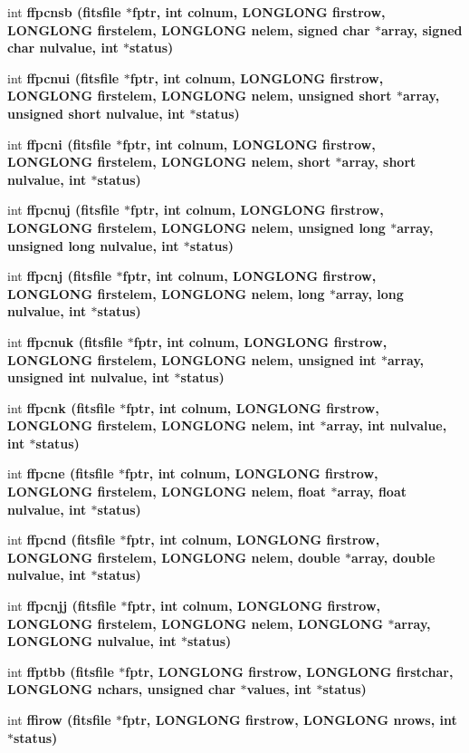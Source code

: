 \begin{CompactItemize}
\item 
int \bf{ffpcnsb} (\bf{fitsfile} $\ast$fptr, int colnum, \bf{LONGLONG} firstrow, \bf{LONGLONG} firstelem, \bf{LONGLONG} nelem, signed char $\ast$array, signed char nulvalue, int $\ast$status)
\item 
int \bf{ffpcnui} (\bf{fitsfile} $\ast$fptr, int colnum, \bf{LONGLONG} firstrow, \bf{LONGLONG} firstelem, \bf{LONGLONG} nelem, unsigned short $\ast$array, unsigned short nulvalue, int $\ast$status)
\item 
int \bf{ffpcni} (\bf{fitsfile} $\ast$fptr, int colnum, \bf{LONGLONG} firstrow, \bf{LONGLONG} firstelem, \bf{LONGLONG} nelem, short $\ast$array, short nulvalue, int $\ast$status)
\item 
int \bf{ffpcnuj} (\bf{fitsfile} $\ast$fptr, int colnum, \bf{LONGLONG} firstrow, \bf{LONGLONG} firstelem, \bf{LONGLONG} nelem, unsigned long $\ast$array, unsigned long nulvalue, int $\ast$status)
\item 
int \bf{ffpcnj} (\bf{fitsfile} $\ast$fptr, int colnum, \bf{LONGLONG} firstrow, \bf{LONGLONG} firstelem, \bf{LONGLONG} nelem, long $\ast$array, long nulvalue, int $\ast$status)
\item 
int \bf{ffpcnuk} (\bf{fitsfile} $\ast$fptr, int colnum, \bf{LONGLONG} firstrow, \bf{LONGLONG} firstelem, \bf{LONGLONG} nelem, unsigned int $\ast$array, unsigned int nulvalue, int $\ast$status)
\item 
int \bf{ffpcnk} (\bf{fitsfile} $\ast$fptr, int colnum, \bf{LONGLONG} firstrow, \bf{LONGLONG} firstelem, \bf{LONGLONG} nelem, int $\ast$array, int nulvalue, int $\ast$status)
\item 
int \bf{ffpcne} (\bf{fitsfile} $\ast$fptr, int colnum, \bf{LONGLONG} firstrow, \bf{LONGLONG} firstelem, \bf{LONGLONG} nelem, float $\ast$array, float nulvalue, int $\ast$status)
\item 
int \bf{ffpcnd} (\bf{fitsfile} $\ast$fptr, int colnum, \bf{LONGLONG} firstrow, \bf{LONGLONG} firstelem, \bf{LONGLONG} nelem, double $\ast$array, double nulvalue, int $\ast$status)
\item 
int \bf{ffpcnjj} (\bf{fitsfile} $\ast$fptr, int colnum, \bf{LONGLONG} firstrow, \bf{LONGLONG} firstelem, \bf{LONGLONG} nelem, \bf{LONGLONG} $\ast$array, \bf{LONGLONG} nulvalue, int $\ast$status)
\item 
int \bf{ffptbb} (\bf{fitsfile} $\ast$fptr, \bf{LONGLONG} firstrow, \bf{LONGLONG} firstchar, \bf{LONGLONG} nchars, unsigned char $\ast$values, int $\ast$status)
\item 
int \bf{ffirow} (\bf{fitsfile} $\ast$fptr, \bf{LONGLONG} firstrow, \bf{LONGLONG} nrows, int $\ast$status)

\end{CompactItemize}
